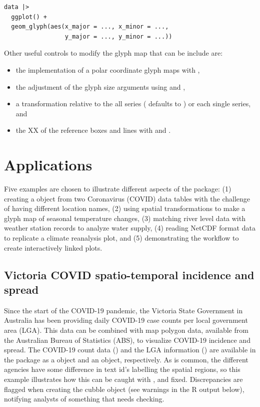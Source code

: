 \documentclass[
  shortnames]{jss}
\providecommand{\tightlist}{%
  \setlength{\itemsep}{0pt}\setlength{\parskip}{0pt}}
\begin{document}
\begin{verbatim}
data |> 
  ggplot() +
  geom_glyph(aes(x_major = ..., x_minor = ..., 
                 y_major = ..., y_minor = ...))
\end{verbatim}

Other useful controls to modify the glyph map that can be include are:

\begin{itemize}
\tightlist
\item
  the implementation of a polar coordinate glyph maps with ,
\item
  the adjustment of the glyph size arguments using  and ,
\item
  a transformation relative to the all series ( defaults to ) or each single series, and
\item
  the XX of the reference boxes and lines with  and .
\end{itemize}

\hypertarget{examples}{%
\section{Applications}\label{examples}}

Five examples are chosen to illustrate different aspects of the  package: (1) creating a  object from two Coronavirus (COVID) data tables with the challenge of having different location names, (2) using spatial transformations to make a glyph map of seasonal temperature changes, (3) matching river level data with weather station records to analyze water supply, (4) reading NetCDF format data to replicate a climate reanalysis plot, and (5) demonstrating the workflow to create interactively linked plots.

\hypertarget{covid}{%
\subsection{Victoria COVID spatio-temporal incidence and spread}\label{covid}}

Since the start of the COVID-19 pandemic, the Victoria State Government in Australia has been providing daily COVID-19 case counts per local government area (LGA). This data can be combined with map polygon data, available from the Australian Bureau of Statistics (ABS), to visualize COVID-19 incidence and spread. The COVID-19 count data () and the LGA information () are available in the  package as a  object and an  object, respectively. As is common, the different agencies have some difference in text id's labelling the spatial regions, so this example illustrates how this can be caught with , and fixed. Discrepancies are flagged when creating the cubble object (see warnings in the R output below), notifying analysts of something that needs checking.
\end{document}
